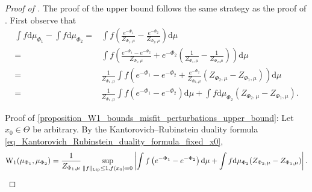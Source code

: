 \documentclass[a4paper]{scrartcl}
\theoremstyle{definition}
\numberwithin{equation}{section}
\newcommand{\rd}{\mathrm{d}}
\newcommand{\Abs}[1]{\left\vert#1\right\vert}
\newcommand{\norm}[1]{\Vert #1 \Vert}
\newcommand{\Lip}[0]{\textup{Lip}}
\newcommand{\Was}[0]{\textup{W}}
\begin{document}
\WassersteinboundsMisfitperturbations*
\begin{proof}[Proof of ]
The proof of the upper bound follows the same strategy as the proof of \cite[Theorem 14]{Sprungk2020}.
First observe that
\begin{align*}
 \int f \rd \mu_{\Phi_1}-\int f \rd \mu_{\Phi_2} =& \int f\left(  \frac{e^{-\Phi_1}}{Z_{\Phi_1,\mu}}-\frac{e^{-\Phi_2}}{Z_{\Phi_2,\mu}} \right)\rd \mu 
 \\
 =&   \int f\left(  \frac{e^{-\Phi_1}-e^{-\Phi_2}}{Z_{\Phi_1,\mu}}+e^{-\Phi_2}\left(\frac{1}{Z_{\Phi_1,\mu}}-\frac{1}{Z_{\Phi_2,\mu}}\right) \right)\rd \mu
 \\
 =&\frac{1}{Z_{\Phi_1,\mu}} \int f\left(  e^{-\Phi_1}-e^{-\Phi_2}+\frac{e^{-\Phi_2}}{Z_{\Phi_2,\mu}}(Z_{\Phi_2,\mu}-Z_{\Phi_1,\mu}) \right)\rd \mu
 \\
 =& \frac{1}{Z_{\Phi_1,\mu}} \int f\left(  e^{-\Phi_1}-e^{-\Phi_2}\right)\rd \mu+\int f \rd \mu_{\Phi_2}(Z_{\Phi_2,\mu}-Z_{\Phi_1,\mu}) .
\end{align*}

Proof of \cref{proposition_W1_bounds_misfit_perturbations_upper_bound}: Let $x_0\in\Theta$ be arbitrary.
By the Kantorovich--Rubinstein duality formula \eqref{eq_Kantorovich_Rubinstein_duality_formula_fixed_x0},
\begin{equation}
\label{eq_W1_equation00}
 \Was_1(\mu_{\Phi_1},\mu_{\Phi_2})=\frac{1}{Z_{\Phi_1,\mu}}\sup_{\norm{f}_{\Lip}\leq 1,f(x_0)=0}\Abs{ \int f\left(  e^{-\Phi_1}-e^{-\Phi_2}\right)\rd \mu+\int f \rd \mu_{\Phi_2}(Z_{\Phi_2,\mu}-Z_{\Phi_1,\mu}) }.
\end{equation}


\end{proof}
\end{document}
